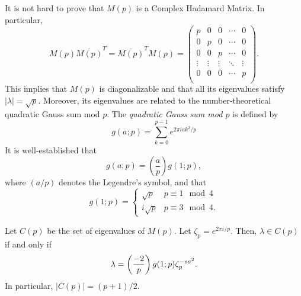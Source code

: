 It is not hard to prove that $M(p)$ is a Complex Hadamard Matrix.  In particular,
\begin{equation}
M(p) \overline{M(p)}^T = \overline{M(p)}^T M(p) = \left(
\begin{array}{ccccc}
  p & 0 & 0 & \cdots & 0 \\
 0 & p & 0 & \cdots & 0 \\
 0 & 0 &p & \cdots & 0 \\
 \vdots & \vdots & \vdots & \ddots  & \vdots \\
 0 & 0 & 0 & \cdots & p \\
\end{array}
\right).
\end{equation}
This implies that $M(p)$ is diagonalizable and that all its eigenvalues satisfy $|\lambda|=\sqrt{p}$.  Moreover, its eigenvalues are related to the number-theoretical quadratic Gauss sum mod $p$.  
The {\it quadratic Gauss sum mod $p$} is defined by
\begin{equation}
g(a;p)=\sum_{k=0}^{p-1}e^{2\pi i ak^2/p}
\end{equation}
It is well-established that
\begin{equation}
g(a;p) = \left(\frac{a}{p}\right)g(1;p),
\end{equation}
where $(a/p)$ denotes the Legendre's symbol, and that
\begin{equation}
\label{gaussvalue}
g(1;p) = \begin{cases}
 \sqrt{p} & p\equiv 1 \mod 4 \\
 i\sqrt{p} & p\equiv 3 \mod 4.
\end{cases}
\end{equation}


\begin{theorem}
\label{eigenthm}
Let $C(p)$ be the set of eigenvalues of $M(p)$. Let $\zeta_p =e^{2\pi i/p}$.  Then, $\lambda \in C(p)$ if and only if
\begin{equation}
\label{eigenvalues}
\lambda = \left(\frac{-2}{p}\right) g(1;p)\zeta_p^{-s a^2}.
\end{equation}
In particular, $|C(p)|=(p+1)/2$.
\end{theorem}

